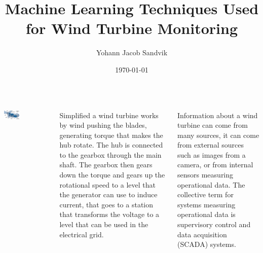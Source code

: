 \documentclass[18pt, a3paper, portrait]{tikzposter}
\title{Machine Learning Techniques Used for Wind Turbine Monitoring}
\author{Yohann Jacob Sandvik}
\date{\today}
\institute{Institute of Electronic Systems - NTNU}
\begin{document}
 
\maketitle 

\begin{columns}
    {
        \begin{tikzfigure}
            \includegraphics[width=0.35\textwidth]{images/wt_parts.png}
        \end{tikzfigure}
    }
 
    {
        Simplified a wind turbine works by wind pushing the blades,
        generating torque that makes the hub rotate. The hub is connected to the gearbox through
        the main shaft. The gearbox then gears down the torque and gears up the rotational speed to
        a level that the generator can use to induce current, that goes to a station that transforms the
        voltage to a level that can be used in the electrical grid. \bigskip

        Information about a wind turbine can come from many sources, it can come from external
        sources such as images from a camera, or from internal sensors measuring operational data.
        The collective term for systems measuring operational data is supervisory control and data
        acquisition (SCADA) systems.
    }
\end{columns}
\end{document}
